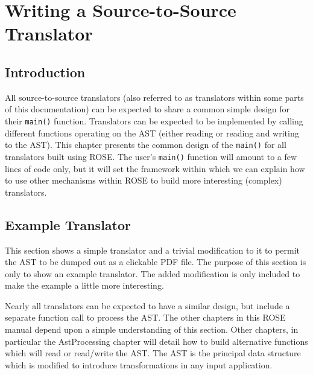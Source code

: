 \chapter{Writing a Source-to-Source Translator}

\label{translatorDesign:translatorDesign}


\section{Introduction}

   All source-to-source translators (also referred to as translators within some parts of
this documentation) can be expected to share a common simple design for their {\tt main()}
function.  Translators can be expected to be implemented by calling different
functions operating on the AST (either reading or reading and writing to the AST).
This chapter presents the common design of the {\tt main()} for all translators
built using ROSE.  The user's {\tt main()} function will amount to a few lines 
of code only, but it will set the framework within which we can explain how to use 
other mechanisms within ROSE to build more interesting (complex) translators.

\section{Example Translator}

   This section shows a simple translator and a trivial modification to it
to permit the AST to be dumped out as a clickable PDF file. The purpose
of this section is only to show an example translator. The added modification is
only included to make the example a little more interesting.

   Nearly all translators can be expected to have a similar design, but include a
separate function call to process the AST. The other chapters in this ROSE manual
depend upon a simple understanding of this section.  Other chapters, in particular
the AstProcessing chapter will detail how to build alternative
functions which will read or read/write the AST.  The AST is the principal
data structure which is modified to introduce transformations in any input application.

